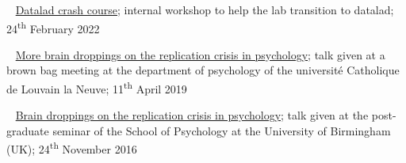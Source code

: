 




\textbullet~ \href{https://cpp-lln-lab.github.io/datalad_crash_course/}
{Datalad crash course};
internal workshop to help the lab transition to datalad;
24\textsuperscript{th} February 2022

\textbullet~ \href{https://osf.io/vu327/}
{More brain droppings on the replication crisis in psychology};
talk given at a brown bag meeting at the department of psychology
of the université Catholique de Louvain la Neuve;
11\textsuperscript{th} April 2019

\textbullet~ \href{https://dx.doi.org/10.6084/m9.figshare.4257992.v1}
{Brain droppings on the replication crisis in psychology};
talk given at the post-graduate seminar of the School of Psychology
at the University of Birmingham (UK);
24\textsuperscript{th} November 2016
